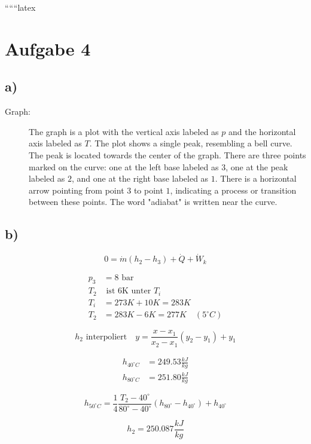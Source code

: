 
``````latex


\section*{Aufgabe 4}

\subsection*{a)}

\begin{description}
    \item[Graph:] The graph is a plot with the vertical axis labeled as \( p \) and the horizontal axis labeled as \( T \). The plot shows a single peak, resembling a bell curve. The peak is located towards the center of the graph. There are three points marked on the curve: one at the left base labeled as \( 3 \), one at the peak labeled as \( 2 \), and one at the right base labeled as \( 1 \). There is a horizontal arrow pointing from point \( 3 \) to point \( 1 \), indicating a process or transition between these points. The word "adiabat" is written near the curve.
\end{description}

\subsection*{b)}

\[
0 = \dot{m} (h_2 - h_3) + \dot{Q} + \dot{W}_k
\]

\begin{align*}
p_3 &= 8 \text{ bar} \\
T_2 &\text{ ist 6K unter } T_i \\
T_i &= 273K + 10K = 283K \\
T_2 &= 283K - 6K = 277K \quad (5^\circ C)
\end{align*}

\[
h_2 \text{ interpoliert} \quad y = \frac{x - x_1}{x_2 - x_1} (y_2 - y_1) + y_1
\]

\begin{align*}
h_{40^\circ C} &= 249.53 \frac{kJ}{kg} \\
h_{80^\circ C} &= 251.80 \frac{kJ}{kg}
\end{align*}

\[
h_{50^\circ C} = \frac{1}{4} \frac{T_2 - 40^\circ}{80^\circ - 40^\circ} (h_{80^\circ} - h_{40^\circ}) + h_{40^\circ}
\]

\[
h_2 = 250.087 \frac{kJ}{kg}
\]

